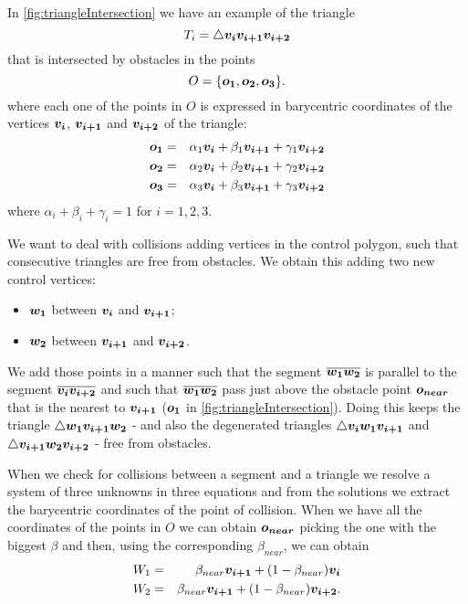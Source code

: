 \documentclass[dissertation.tex]{subfiles}
\begin{document}
In \cref{fig:triangleIntersection} we have an example of the triangle
\begin{equation*}
  T_i = \triangle \boldsymbol{v_i}\boldsymbol{v_{i+1}}\boldsymbol{v_{i+2}} 
\end{equation*}
that is
intersected by obstacles in the points
\begin{equation*}
  O = \{\boldsymbol{o_1},\boldsymbol{o_2},\boldsymbol{o_3}\}.
\end{equation*}
where each one of the points in $O$ is expressed in barycentric
coordinates of the vertices $\boldsymbol{v_i}$, $\boldsymbol{v_{i+1}}$ and $\boldsymbol{v_{i+2}}$ of the
triangle:
\begin{eqnarray*}
  \boldsymbol{o_1}&=&\alpha_1 \boldsymbol{v_i}+\beta_1 \boldsymbol{v_{i+1}}+\gamma_1 \boldsymbol{v_{i+2}}\\
  \boldsymbol{o_2}&=&\alpha_2 \boldsymbol{v_i}+\beta_2 \boldsymbol{v_{i+1}}+\gamma_2 \boldsymbol{v_{i+2}}\\
  \boldsymbol{o_3}&=&\alpha_3 \boldsymbol{v_i}+\beta_3 \boldsymbol{v_{i+1}}+\gamma_3 \boldsymbol{v_{i+2}}
\end{eqnarray*}
where $\alpha_i+\beta_i+\gamma_i=1$ for $i=1,2,3$.

We want to deal with collisions adding vertices in the control
polygon, such that consecutive triangles are free from obstacles. We
obtain this adding two new control vertices: 
\begin{itemize}
\item $\boldsymbol{w_1}$ between $\boldsymbol{v_i}$ and $\boldsymbol{v_{i+1}}$;
\item $\boldsymbol{w_2}$ between $\boldsymbol{v_{i+1}}$ and $\boldsymbol{v_{i+2}}$.
\end{itemize}
We add those
points in a manner such that the segment $\overline{\boldsymbol{w_1}\boldsymbol{w_2}}$ is
parallel to the segment $\overline{\boldsymbol{v_i}\boldsymbol{v_{i+2}}}$ and such that
$\overline{\boldsymbol{w_1}\boldsymbol{w_2}}$ pass just above the obstacle point
$\boldsymbol{o_{near}}$ that is the nearest
to $\boldsymbol{v_{i+1}}$ ($\boldsymbol{o_1}$ in
\cref{fig:triangleIntersection}). Doing this keeps the
triangle $\triangle \boldsymbol{w_1}\boldsymbol{v_{i+1}}\boldsymbol{w_2}$ - and also
the degenerated triangles $\triangle \boldsymbol{v_i}\boldsymbol{w_1}\boldsymbol{v_{i+1}}$ and $\triangle
\boldsymbol{v_{i+1}}\boldsymbol{w_2}\boldsymbol{v_{i+2}}$ - free from obstacles.

When we check for collisions between a segment and a triangle we
resolve a system of three unknowns in
three equations and from the solutions we extract the barycentric
coordinates of
the point of collision. When we have all the coordinates of the points
in $O$ we can obtain $\boldsymbol{o_{near}}$ picking the one with the biggest $\beta$
and then, using the corresponding $\beta_{near}$, we can obtain
\begin{eqnarray*}
  W_1&=&\beta_{near} \boldsymbol{v_{i+1}}+(1-\beta_{near})\boldsymbol{v_i}\\
  W_2&=&\beta_{near} \boldsymbol{v_{i+1}}+(1-\beta_{near})\boldsymbol{v_{i+2}}.
\end{eqnarray*}
\end{document}
